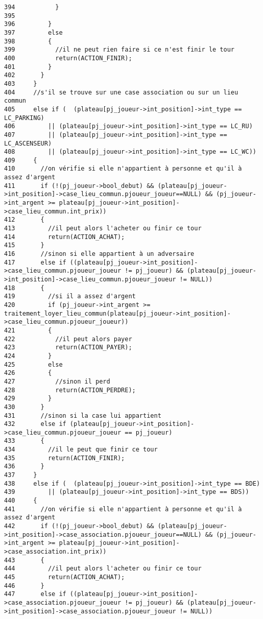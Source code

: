 \begin{Code}
\begin{verbatim}
394           }
395           
396         }
397         else
398         {
399           //il ne peut rien faire si ce n'est finir le tour
400           return(ACTION_FINIR);
401         }
402       }
403     }
404     //s'il se trouve sur une case association ou sur un lieu commun
405     else if (  (plateau[pj_joueur->int_position]->int_type == LC_PARKING)
406         || (plateau[pj_joueur->int_position]->int_type == LC_RU)
407         || (plateau[pj_joueur->int_position]->int_type == LC_ASCENSEUR)
408         || (plateau[pj_joueur->int_position]->int_type == LC_WC))
409     {
410       //on vérifie si elle n'appartient à personne et qu'il à assez d'argent
411       if (!(pj_joueur->bool_debut) && (plateau[pj_joueur->int_position]->case_lieu_commun.pjoueur_joueur==NULL) && (pj_joueur->int_argent >= plateau[pj_joueur->int_position]->case_lieu_commun.int_prix))
412       {
413         //il peut alors l'acheter ou finir ce tour
414         return(ACTION_ACHAT);
415       }
416       //sinon si elle appartient à un adversaire
417       else if ((plateau[pj_joueur->int_position]->case_lieu_commun.pjoueur_joueur != pj_joueur) && (plateau[pj_joueur->int_position]->case_lieu_commun.pjoueur_joueur != NULL))
418       {
419         //si il a assez d'argent
420         if (pj_joueur->int_argent >= traitement_loyer_lieu_commun(plateau[pj_joueur->int_position]->case_lieu_commun.pjoueur_joueur))
421         {
422           //il peut alors payer
423           return(ACTION_PAYER);
424         }
425         else
426         {
427           //sinon il perd
428           return(ACTION_PERDRE);
429         }
430       }
431       //sinon si la case lui appartient
432       else if (plateau[pj_joueur->int_position]->case_lieu_commun.pjoueur_joueur == pj_joueur)
433       {
434         //il le peut que finir ce tour
435         return(ACTION_FINIR);
436       }
437     }
438     else if (  (plateau[pj_joueur->int_position]->int_type == BDE)
439         || (plateau[pj_joueur->int_position]->int_type == BDS))
440     {
441       //on vérifie si elle n'appartient à personne et qu'il à assez d'argent
442       if (!(pj_joueur->bool_debut) && (plateau[pj_joueur->int_position]->case_association.pjoueur_joueur==NULL) && (pj_joueur->int_argent >= plateau[pj_joueur->int_position]->case_association.int_prix))
443       {
444         //il peut alors l'acheter ou finir ce tour
445         return(ACTION_ACHAT);
446       }
447       else if ((plateau[pj_joueur->int_position]->case_association.pjoueur_joueur != pj_joueur) && (plateau[pj_joueur->int_position]->case_association.pjoueur_joueur != NULL))

\end{verbatim}
\end{Code}
